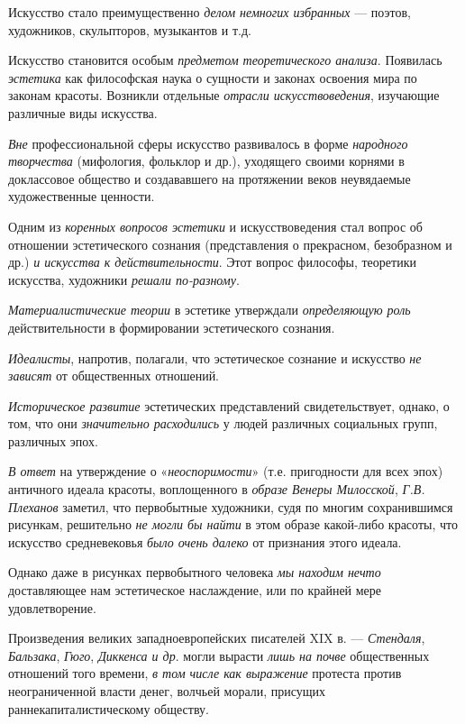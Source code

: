 \documentclass[a4paper,14pt,russian]{extreport}
\begin{document}
Искусство стало преимущественно \emph{делом немногих избранных} --- поэтов, художников, скульпторов, музыкантов и т.д.

Искусство становится особым \emph{предметом теоретического анализа}. Появилась \emph{эстетика} как философская наука о сущности и законах освоения мира по законам красоты. Возникли отдельные \emph{отрасли искусствоведения}, изучающие различные виды искусства.

\emph{Вне} профессиональной сферы искусство развивалось в форме \emph{народного творчества} (мифология, фольклор и др.), уходящего своими корнями в доклассовое общество и создававшего на протяжении веков неувядаемые художественные ценности.

Одним из \emph{коренных вопросов эстетики} и искусствоведения стал вопрос об отношении эстетического сознания (представления о прекрасном, безобразном и др.) \emph{и искусства к действительности}. Этот вопрос философы, теоретики искусства, художники \emph{решали по-разному}.

\emph{Материалистические теории} в эстетике утверждали \emph{определяющую роль} действительности в формировании эстетического сознания.

\emph{Идеалисты}, напротив, полагали, что эстетическое сознание и искусство \emph{не зависят} от общественных отношений.

\emph{Историческое развитие} эстетических представлений свидетельствует, однако, о том, что они \emph{значительно расходились} у людей различных социальных групп, различных эпох.

\emph{В ответ} на утверждение о «\emph{неоспоримости}» (т.е. пригодности для всех эпох) античного идеала красоты, воплощенного в \emph{образе Венеры Милосской}, \emph{Г.В. Плеханов} заметил, что первобытные художники, судя по многим сохранившимся рисункам, решительно \emph{не могли бы найти} в этом образе какой-либо красоты, что искусство средневековья \emph{было очень далеко} от признания этого идеала.

Однако даже в рисунках первобытного человека \emph{мы находим нечто} доставляющее нам эстетическое наслаждение, или по крайней мере удовлетворение.

Произведения великих западноевропейских писателей XIX в. --- \emph{Стендаля}, \emph{Бальзака}, \emph{Гюго}, \emph{Диккенса и др}. могли вырасти \emph{лишь на почве} общественных отношений того времени, \emph{в том числе как выражение} протеста против неограниченной власти денег, волчьей морали, присущих раннекапиталистическому обществу.
\end{document}
